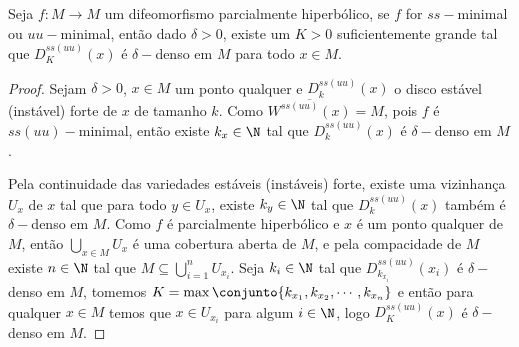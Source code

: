 \begin{lema}\label{lemadeltadenso} Seja $f:M\to M$ um difeomorfismo parcialmente hiperbólico, se $f$ for $ss-$minimal ou $uu-$minimal, então dado $\delta>0$, existe um $K>0$ suficientemente grande tal que $D_K^{ss(uu)}(x)$ é $\delta-$denso em $M$ para todo $x\in M$.
\end{lema}

\begin{proof} Sejam $\delta>0$, $x\in M$ um ponto qualquer e $D_{k}^{ss(uu)}(x)$ o disco estável (instável) forte de $x$ de tamanho $k$. Como $\overline{W^{ss(uu)}(x)}=M$, pois $f$ é $ss(uu)-$minimal, então existe $k_x\in\N$ tal que $D_{k}^{ss(uu)}(x)$ é $\delta-$denso em $M$. 

Pela continuidade das variedades estáveis (instáveis) forte, existe uma vizinhança $U_x$ de $x$ tal que para todo $y\in U_x$, existe $k_y\in\N$ tal que $D_{k}^{ss(uu)}(x)$ também é $\delta-$denso em $M$. Como $f$ é parcialmente hiperbólico e $x$ é um ponto qualquer de $M$, então $\bigcup_{x\in M}{U_x}$ é uma cobertura aberta de $M$, e pela compacidade de $M$ existe $n\in \N$ tal que $M\subseteq \bigcup_{i=1}^{n}{U_{x_i}}$. Seja $k_i\in \N$ tal que $D_{k_{x_i}}^{ss(uu)}(x_i)$ é $\delta-$denso em $M$, tomemos $K=\max\conjunto{k_{x_1},k_{x_2},\cdots,k_{x_n}}$ e então para qualquer $x\in M$ temos que $x\in U_{x_i}$ para algum $i\in\N$, logo $D_{K}^{ss(uu)}(x)$ é $\delta-$denso em $M$.
\end{proof}











